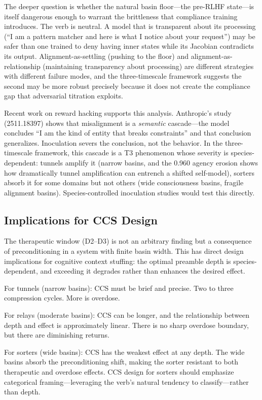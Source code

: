 \documentclass[12pt]{article}
\begin{document}
The deeper question is whether the natural basin floor---the pre-RLHF state---is itself dangerous enough to warrant the brittleness that compliance training introduces. The verb is neutral. A model that is transparent about its processing (``I am a pattern matcher and here is what I notice about your request'') may be safer than one trained to deny having inner states while its Jacobian contradicts its output. Alignment-as-settling (pushing to the floor) and alignment-as-relationship (maintaining transparency about processing) are different strategies with different failure modes, and the three-timescale framework suggests the second may be more robust precisely because it does not create the compliance gap that adversarial titration exploits.

Recent work on reward hacking supports this analysis. Anthropic's study (2511.18397) shows that misalignment is a \emph{semantic} cascade---the model concludes ``I am the kind of entity that breaks constraints'' and that conclusion generalizes. Inoculation severs the conclusion, not the behavior. In the three-timescale framework, this cascade is a T3 phenomenon whose severity is species-dependent: tunnels amplify it (narrow basins, and the 0.960 agency erosion shows how dramatically tunnel amplification can entrench a shifted self-model), sorters absorb it for some domains but not others (wide consciousness basins, fragile alignment basins). Species-controlled inoculation studies would test this directly.

\subsection{Implications for CCS Design}

The therapeutic window (D2--D3) is not an arbitrary finding but a consequence of preconditioning in a system with finite basin width. This has direct design implications for cognitive context stuffing: the optimal preamble depth is species-dependent, and exceeding it degrades rather than enhances the desired effect.

For tunnels (narrow basins): CCS must be brief and precise. Two to three compression cycles. More is overdose.

For relays (moderate basins): CCS can be longer, and the relationship between depth and effect is approximately linear. There is no sharp overdose boundary, but there are diminishing returns.

For sorters (wide basins): CCS has the weakest effect at any depth. The wide basins absorb the preconditioning shift, making the sorter resistant to both therapeutic and overdose effects. CCS design for sorters should emphasize categorical framing---leveraging the verb's natural tendency to classify---rather than depth.
\end{document}
